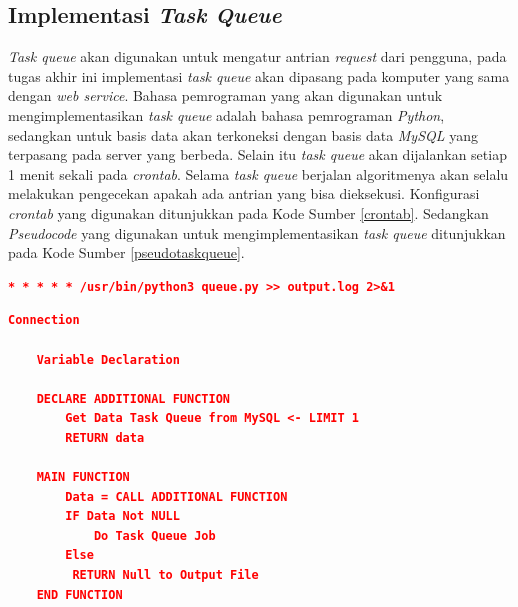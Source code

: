 		\subsection{Implementasi \textit{Task Queue}}
			\textit{Task queue} akan digunakan untuk mengatur antrian \textit{request} dari pengguna, pada tugas akhir ini implementasi \textit{task queue} akan dipasang pada komputer yang sama dengan \textit{web service}. Bahasa pemrograman yang akan digunakan untuk mengimplementasikan \textit{task queue} adalah bahasa pemrograman \textit{Python}, sedangkan untuk basis data akan terkoneksi dengan basis data \textit{MySQL} yang terpasang pada server yang berbeda. Selain itu \textit{task queue} akan dijalankan setiap 1 menit sekali pada \textit{crontab}. Selama \textit{task queue} berjalan algoritmenya akan selalu melakukan pengecekan apakah ada antrian yang bisa dieksekusi. Konfigurasi \textit{crontab} yang digunakan ditunjukkan pada Kode Sumber \ref{crontab}. Sedangkan \textit{Pseudocode} yang digunakan untuk mengimplementasikan \textit{task queue} ditunjukkan pada Kode Sumber \ref{pseudotaskqueue}. \\
			
			\begin{lstlisting}[frame=single,tabsize=2,breaklines,caption={Konfigurasi \textit{crontab} },label=crontab, captionpos=b, language=json]
			* * * * * /usr/bin/python3 queue.py >> output.log 2>&1
			\end{lstlisting}
			
			\begin{lstlisting}[frame=single,tabsize=2,breaklines,caption={\textit{Pseudocode task queue} },label=pseudotaskqueue, captionpos=b, language=json]
	Connection
	
	Variable Declaration

	DECLARE ADDITIONAL FUNCTION
		Get Data Task Queue from MySQL <- LIMIT 1
		RETURN data
	
	MAIN FUNCTION
		Data = CALL ADDITIONAL FUNCTION
		IF Data Not NULL
			Do Task Queue Job
		Else
		 RETURN Null to Output File
	END FUNCTION
			\end{lstlisting}
			
			